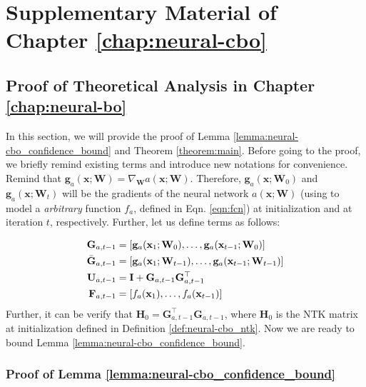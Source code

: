 \chapter{Supplementary Material of Chapter \ref{chap:neural-cbo}} 
\label{section:neural-cbo_supp}

\section{Proof of Theoretical Analysis in Chapter \ref{chap:neural-bo}}
\label{section:neural-cbo_appendix}

In this section, we will provide the proof of Lemma \ref{lemma:neural-cbo_confidence_bound} and Theorem \ref{theorem:main}. Before going to the proof, we briefly remind existing terms and introduce new notations for convenience.
Remind that $\mathbf{g}_{a}(\mathbf{x}; \mathbf{W}) = \nabla_{\mathbf{W}}a(\mathbf{x}; \mathbf{W})$. Therefore, $\mathbf{g}_{a}(\mathbf{x}; \mathbf{W}_0)$ and $\mathbf{g}_{a}(\mathbf{x}; \mathbf{W}_t)$ will be the gradients of the neural network $a(\mathbf{x}; \mathbf{W})$ (using to model a \textit{arbitrary} function $f_a$, defined in Eqn. \ref{eqn:fcn}) at initialization and at iteration $t$, respectively.  Further, let us define terms as follows:

\begin{equation}
\label{def:neural_cbo_linear_kernelized_terms}
\begin{split}
\mathbf{G}_{a,t-1} & = [\mathbf{g}_{a}(\mathbf{x}_1; \mathbf{W}_0),\dots, \mathbf{g}_{a}(\mathbf{x}_{t-1}; \mathbf{W}_0)] 
\\
\Bar{\mathbf{G}}_{a,t-1} & = [\mathbf{g}_{a}(\mathbf{x}_1; \mathbf{W}_{t-1}),\dots, \mathbf{g}_{a}(\mathbf{x}_{t-1}; \mathbf{W}_{t-1})] 
\\
\mathbf{U}_{a,t-1} &=  \mathbf{I} + \mathbf{G}_{a,t-1} \mathbf{G}_{a,t-1}^\top 
\\
\mathbf{F}_{a,t-1} &= [f_a(\mathbf{x}_1), \dots, f_a(\mathbf{x}_{t-1})]
\end{split}
\end{equation}
Further, it can be verify that $\mathbf{H}_0 = \mathbf{G}_{a,t-1} ^\top\mathbf{G}_{a,t-1}$, where $\mathbf{H}_0$ is the NTK matrix at initialization defined in Definition \ref{def:neural-cbo_ntk}.  Now we are ready to bound Lemma \ref{lemma:neural-cbo_confidence_bound}.

\subsection{Proof of Lemma \ref{lemma:neural-cbo_confidence_bound}}
\ConfidenceBound*

